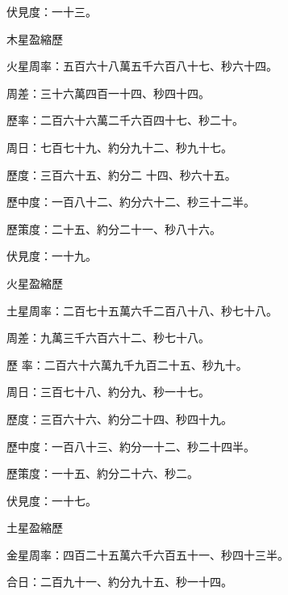 \begin{pinyinscope}
 伏見度：一十三。



 木星盈縮歷



 火星周率：五百六十八萬五千六百八十七、秒六十四。



 周差：三十六萬四百一十四、秒四十四。



 歷率：二百六十六萬二千六百四十七、秒二十。



 周日：七百七十九、約分九十二、秒九十七。



 歷度：三百六十五、約分二
 十四、秒六十五。



 歷中度：一百八十二、約分六十二、秒三十二半。



 歷策度：二十五、約分二十一、秒八十六。



 伏見度：一十九。



 火星盈縮歷



 土星周率：二百七十五萬六千二百八十八、秒七十八。



 周差：九萬三千六百六十二、秒七十八。



 歷
 率：二百六十六萬九千九百二十五、秒九十。



 周日：三百七十八、約分九、秒一十七。



 歷度：三百六十六、約分二十四、秒四十九。



 歷中度：一百八十三、約分一十二、秒二十四半。



 歷策度：一十五、約分二十六、秒二。



 伏見度：一十七。



 土星盈縮歷



 金星周率：四百二十五萬六千六百五十一、秒四十三半。



 合日：二百九十一、約分九十五、秒一十四。




\end{pinyinscope}
